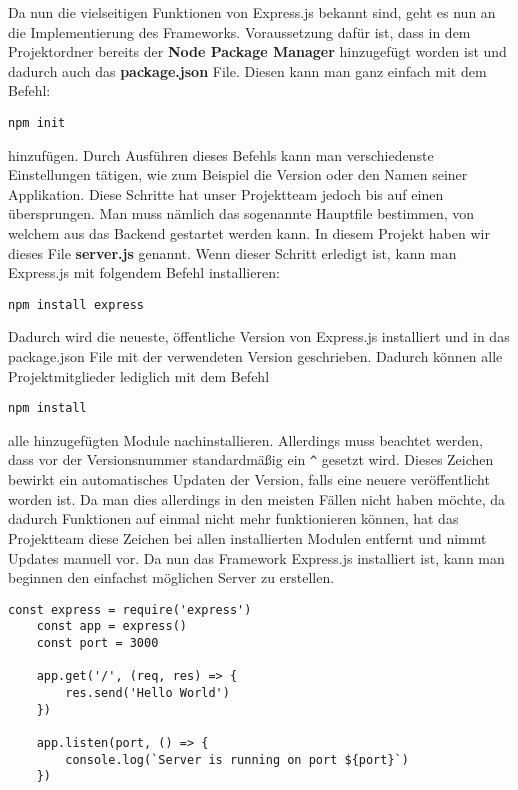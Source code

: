 Da nun die vielseitigen Funktionen von Express.js bekannt sind, geht es nun an die Implementierung des Frameworks. Voraussetzung dafür ist, dass in dem Projektordner bereits der \textbf{Node Package Manager} hinzugefügt worden ist und dadurch auch das \textbf{package.json} File. Diesen kann man ganz einfach mit dem Befehl:
\begin{verbatim}
npm init
\end{verbatim}
hinzufügen. Durch Ausführen dieses Befehls kann man verschiedenste Einstellungen tätigen, wie zum Beispiel die Version oder den Namen seiner Applikation. Diese Schritte hat unser Projektteam jedoch bis auf einen übersprungen. Man muss nämlich das sogenannte Hauptfile bestimmen, von welchem aus das Backend gestartet werden kann. In diesem Projekt haben wir dieses File \textbf{server.js} genannt. Wenn dieser Schritt erledigt ist, kann man Express.js mit folgendem Befehl installieren:
\begin{verbatim}
npm install express
\end{verbatim}
Dadurch wird die neueste, öffentliche Version von Express.js installiert und in das package.json File mit der verwendeten Version geschrieben. Dadurch können alle Projektmitglieder lediglich mit dem Befehl
\begin{verbatim}
npm install
\end{verbatim}
alle hinzugefügten Module nachinstallieren. Allerdings muss beachtet werden, dass vor der Versionsnummer standardmäßig ein \verb|^| gesetzt wird. Dieses Zeichen bewirkt ein automatisches Updaten der Version, falls eine neuere veröffentlicht worden ist. Da man dies allerdings in den meisten Fällen nicht haben möchte, da dadurch Funktionen auf einmal nicht mehr funktionieren können, hat das Projektteam diese Zeichen bei allen installierten Modulen entfernt und nimmt Updates manuell vor.
\newline
\cite{installing_express_js}
\newline
Da nun das Framework Express.js installiert ist, kann man beginnen den einfachst möglichen Server zu erstellen.
\begin{lstlisting}[caption=Einfachst möglicher express.js Server]
    const express = require('express')
    const app = express()
    const port = 3000

    app.get('/', (req, res) => {
        res.send('Hello World')
    })

    app.listen(port, () => {
        console.log(`Server is running on port ${port}`)
    })
\end{lstlisting}
